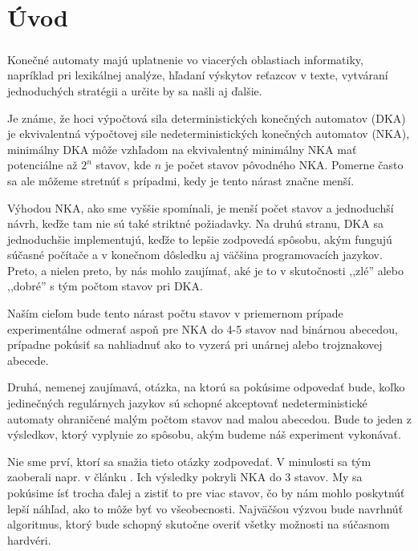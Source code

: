 \chapter*{Úvod}
\paragraph{}
Konečné automaty majú uplatnenie vo viacerých oblastiach informatiky, napríklad pri lexikálnej analýze, hľadaní výskytov reťazcov v texte, vytváraní jednoduchých stratégii a určite by sa našli aj ďalšie.

Je známe, že hoci výpočtová sila deterministických konečných automatov (DKA) je ekvivalentná výpočtovej sile nedeterministických konečných automatov (NKA), minimálny DKA môže vzhľadom na ekvivalentný minimálny NKA mať potenciálne až $2^n$ stavov, kde $n$ je počet stavov pôvodného NKA. Pomerne často sa ale môžeme stretnúť s prípadmi, kedy je tento nárast značne menší.

Výhodou NKA, ako sme vyššie spomínali, je menší počet stavov a jednoduchší návrh, keďže tam nie sú také striktné požiadavky. Na druhú stranu, DKA sa jednoduchšie implementujú, keďže to lepšie zodpovedá spôsobu, akým fungujú súčasné počítače a v konečnom dôsledku aj väčšina programovacích jazykov. Preto, a nielen preto, by nás mohlo zaujímať, aké je to v skutočnosti ,,zlé'' alebo ,,dobré'' s tým počtom stavov pri DKA. 

Naším cieľom bude tento nárast počtu stavov v priemernom prípade experimentálne odmerať aspoň pre NKA do 4-5 stavov nad binárnou abecedou, prípadne pokúsiť sa nahliadnuť ako to vyzerá pri unárnej alebo trojznakovej abecede.

Druhá, nemenej zaujímavá, otázka, na ktorú sa pokúsime odpovedať bude, koľko jedinečných regulárnych jazykov sú schopné akceptovať nedeterministické automaty ohraničené malým počtom stavov nad malou abecedou. Bude to jeden z výsledkov, ktorý vyplynie zo spôsobu, akým budeme náš experiment vykonávať.

Nie sme prví, ktorí sa snažia tieto otázky zodpovedať. V minulosti sa tým zaoberali napr. v článku \cite{shallit}. Ich výsledky pokryli NKA do 3 stavov. My sa pokúsime ísť trocha ďalej a zistiť to pre viac stavov, čo by nám mohlo poskytnúť lepší náhľad, ako to môže byť vo všeobecnosti. Najväčšou výzvou bude navrhnúť algoritmus, ktorý bude schopný skutočne overiť všetky možnosti na súčasnom hardvéri.


